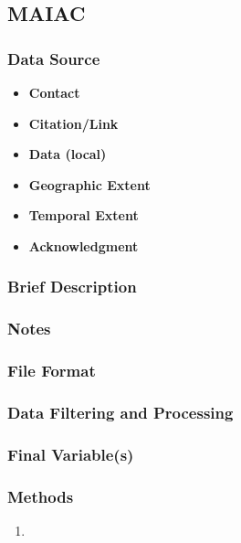 \subsection{MAIAC}

\subsubsection*{Data Source}

\begin{itemize}[nolistsep]
\item \textbf{Contact}
\item \textbf{Citation/Link}
\item \textbf{Data (local)}
\item \textbf{Geographic Extent}
\item \textbf{Temporal Extent}
\item \textbf{Acknowledgment}
\end{itemize}

\subsubsection*{Brief Description}



\subsubsection*{Notes}

\subsubsection*{File Format} 

\subsubsection*{Data Filtering and Processing}

\subsubsection*{Final Variable(s)}

\subsubsection*{Methods}

\begin{enumerate}
\item 

\end{enumerate}

